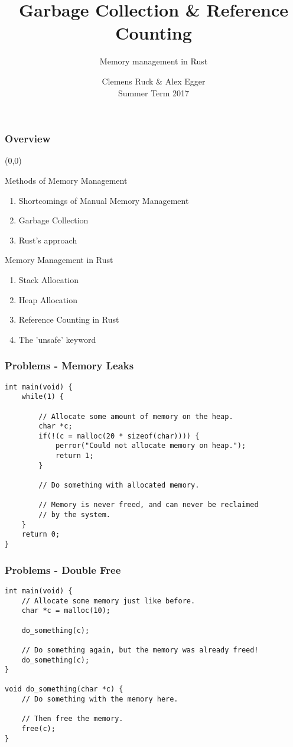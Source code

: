 \documentclass{beamer}
\title{Garbage Collection \& Reference Counting}
\author{Memory management in Rust}
\institute[TUM]{
	\vspace{-15em}\tumheader\vspace{18em}}
\date{Clemens Ruck \& Alex Egger \\ Summer Term 2017}
\begin{document}
\maketitle
\begin{frame}
	\frametitle{Overview}
	\begin{textblock}{6}(0,0)
		\begin{alertblock}{Methods of Memory Management}
			\begin{enumerate}
				\item Shortcomings of Manual Memory Management
				\item Garbage Collection
				\item Rust's approach
			\end{enumerate}
		\end{alertblock}
		\begin{alertblock}{Memory Management in Rust}
			\begin{enumerate}
				\item Stack Allocation
				\item Heap Allocation
				\item Reference Counting in Rust
				\item The 'unsafe' keyword
			\end{enumerate}
		\end{alertblock}
	\end{textblock}
\end{frame}
\begin{frame}[fragile]
	\frametitle{Problems - Memory Leaks}
	\begin{verbatim}
int main(void) {
	while(1) {

		// Allocate some amount of memory on the heap.
		char *c;
		if(!(c = malloc(20 * sizeof(char)))) {
			perror("Could not allocate memory on heap.");
			return 1;
		}

		// Do something with allocated memory.

		// Memory is never freed, and can never be reclaimed
		// by the system.
	}
	return 0;
}
	\end{verbatim}
\end{frame}
\begin{frame}[fragile]
	\frametitle{Problems - Double Free}
	\begin{verbatim}
int main(void) {
	// Allocate some memory just like before.
	char *c = malloc(10);

	do_something(c);

	// Do something again, but the memory was already freed!
	do_something(c);
}

void do_something(char *c) {
	// Do something with the memory here.

	// Then free the memory.
	free(c);
}
	\end{verbatim}
\end{frame}
\end{document}
